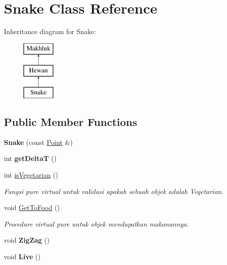 \hypertarget{class_snake}{}\section{Snake Class Reference}
\label{class_snake}
Inheritance diagram for Snake\+:\begin{figure}[H]
\begin{center}
\leavevmode
\includegraphics[height=3.000000cm]{class_snake}
\end{center}
\end{figure}
\subsection*{Public Member Functions}
\begin{DoxyCompactItemize}
\item 
{\bfseries Snake} (const \hyperlink{class_point}{Point} \&)\hypertarget{class_snake_a1c1bfb186b5b74d5b8b2bee282e7273e}{}\label{class_snake_a1c1bfb186b5b74d5b8b2bee282e7273e}

\item 
int {\bfseries get\+DeltaT} ()\hypertarget{class_snake_a16c276bca5b03aed618976aeb79d0bdb}{}\label{class_snake_a16c276bca5b03aed618976aeb79d0bdb}

\item 
int \hyperlink{class_snake_a511252859c8eb005b8e4cff200973465}{is\+Vegetarian} ()
\begin{DoxyCompactList}\small\item\em Fungsi pure virtual untuk validasi apakah sebuah objek adalah Vegetarian. \end{DoxyCompactList}\item 
void \hyperlink{class_snake_a605e8e7245842e44f2882395e28b02fe}{Get\+To\+Food} ()
\begin{DoxyCompactList}\small\item\em Procedure virtual pure untuk objek mendapatkan makanannya. \end{DoxyCompactList}\item 
void {\bfseries Zig\+Zag} ()\hypertarget{class_snake_a3921ed0d6fc728f3e1f920d7d2a67184}{}\label{class_snake_a3921ed0d6fc728f3e1f920d7d2a67184}

\item 
void {\bfseries Live} ()\hypertarget{class_snake_a2c340a6cb7f298c2ea7dd1be2c7805fc}{}\label{class_snake_a2c340a6cb7f298c2ea7dd1be2c7805fc}

\end{DoxyCompactItemize}
